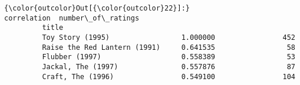 \documentclass[11pt]{article}
\begin{document}
\begin{Verbatim}[commandchars=\\\{\}]
{\color{outcolor}Out[{\color{outcolor}22}]:}                               correlation  number\_of\_ratings
         title                                                       
         Toy Story (1995)                 1.000000                452
         Raise the Red Lantern (1991)     0.641535                 58
         Flubber (1997)                   0.558389                 53
         Jackal, The (1997)               0.557876                 87
         Craft, The (1996)                0.549100                104
\end{Verbatim}
            

    
    
    
    
\end{document}
